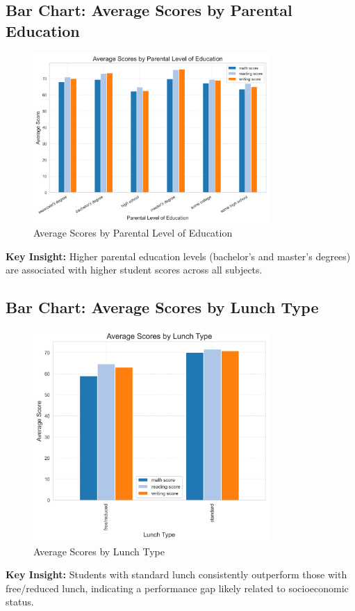 \documentclass[12pt]{article}
\begin{document}
\subsection{Bar Chart: Average Scores by Parental Education}
\begin{figure}[H]
    \centering
    \includegraphics[width=0.8\textwidth]{figures/barchart_avg_scores_by_parent_edu.png}
    \caption{Average Scores by Parental Level of Education}
\end{figure}
\textbf{Key Insight:} Higher parental education levels (bachelor's and master's degrees) are associated with higher student scores across all subjects.

\subsection{Bar Chart: Average Scores by Lunch Type}
\begin{figure}[H]
    \centering
    \includegraphics[width=0.8\textwidth]{figures/barchart_avg_scores_by_lunch.png}
    \caption{Average Scores by Lunch Type}
\end{figure}
\textbf{Key Insight:} Students with standard lunch consistently outperform those with free/reduced lunch, indicating a performance gap likely related to socioeconomic status.
\end{document}
